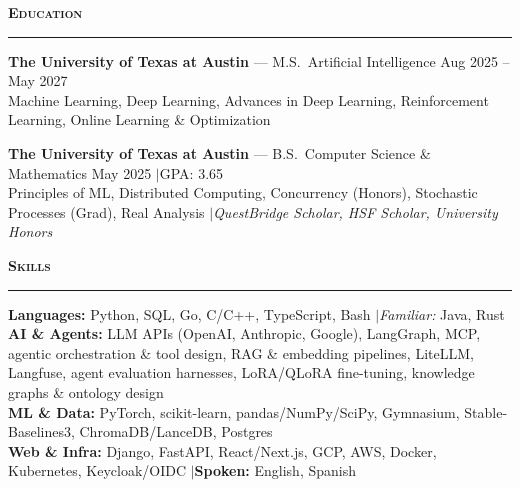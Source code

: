 \documentclass[letterpaper,10.5pt]{article}
\renewcommand{\section}[1]{%
  \vspace{0.5em}%
  {\normalsize\bfseries\scshape #1}%
  \vspace{-0.5em}%
  \par\noindent\rule{\textwidth}{0.4pt}%
  \vspace{0.15em}%
}
\begin{document}
\section{Education}

{\small
\textbf{The University of Texas at Austin} --- M.S.\ Artificial Intelligence \hfill Aug 2025 -- May 2027 \\
Machine Learning, Deep Learning, Advances in Deep Learning, Reinforcement Learning, Online Learning \& Optimization

\vspace{2pt}
\textbf{The University of Texas at Austin} --- B.S.\ Computer Science \& Mathematics \hfill May 2025 \enspace$\vert$\enspace GPA: 3.65 \\
Principles of ML, Distributed Computing, Concurrency (Honors), Stochastic Processes (Grad), Real Analysis \enspace$\vert$\enspace \textit{QuestBridge Scholar, HSF Scholar, University Honors}
}

\section{Skills}

{\small
\textbf{Languages:} Python, SQL, Go, C/C++, TypeScript, Bash \enspace$\vert$\enspace \textit{Familiar:} Java, Rust \\
\textbf{AI \& Agents:} LLM APIs (OpenAI, Anthropic, Google), LangGraph, MCP, agentic orchestration \& tool design, RAG \& embedding pipelines, LiteLLM, Langfuse, agent evaluation harnesses, LoRA/QLoRA fine-tuning, knowledge graphs \& ontology design \\
\textbf{ML \& Data:} PyTorch, scikit-learn, pandas/NumPy/SciPy, Gymnasium, Stable-Baselines3, ChromaDB/LanceDB, Postgres \\
\textbf{Web \& Infra:} Django, FastAPI, React/Next.js, GCP, AWS, Docker, Kubernetes, Keycloak/OIDC \enspace$\vert$\enspace \textbf{Spoken:} English, Spanish
}
\end{document}
